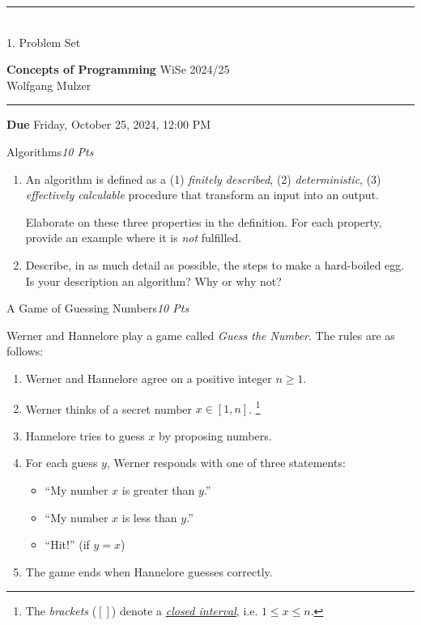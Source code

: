 \documentclass[a4paper,twoside,12pt]{article}
\newcommand{\ZETTELNUMMER}{1}
\newcommand{\ABGABEDATUM}{Friday, October 25, 2024, 12:00 PM}
\newcounter{AUFGNR}
\newcommand{\AUFGABE}[2]{\vspace{0.3cm}\item[Problem \arabic{AUFGNR}]\stepcounter{AUFGNR} #1\hfill\emph{#2}}
\begin{document}
\pagestyle{empty}
\hrule\medskip
\rule{0ex}{0ex}\\[-1ex]
\ZETTELNUMMER. Problem Set

\smallskip
\noindent
\large
\textbf{Concepts of Programming}\hfill 
WiSe 2024/25 \\[0.5ex]
\normalsize
Wolfgang Mulzer

\medskip\hrule

\smallskip
\noindent
\textbf{Due} \ABGABEDATUM

\vskip 0.5cm

\begin{description}

		\AUFGABE{Algorithms}{10 Pts}
\begin{enumerate}

\item An algorithm is defined as a (1) \emph{finitely described},
(2) \emph{deterministic}, (3) \emph{effectively calculable} procedure
that transform an input into an output.

Elaborate on these three properties in the definition.
For each property, provide an example
where it is \emph{not} fulfilled.

\item Describe, in as much detail as possible, the steps to
  make a hard-boiled egg. Is your description an algorithm?
Why or why not?
\end{enumerate} 



\AUFGABE{A Game of Guessing Numbers}{10 Pts}

Werner and Hannelore play a game called \emph{Guess the Number}.
The rules are as follows:
\begin{enumerate}
\item Werner and Hannelore agree on a positive integer $n \geq 1$.
\item Werner thinks of a secret number $x\in \left[1,n\right]$. \footnote{The \emph{brackets} ($\left[ \right]$) denote a \href{https://en.wikipedia.org/wiki/Interval_(mathematics)}{\emph{closed interval}}, i.e. $1\leq x \leq n$.} 
\item Hannelore tries to guess $x$ by proposing numbers.
\item For each guess $y$, Werner responds with one of three statements:
  \begin {itemize}
  \item ``My number $x$ is greater than $y$.''
  \item ``My number $x$ is less than $y$.''
  \item ``Hit!'' (if $y=x$)
  \end {itemize}
\item The game ends when Hannelore guesses correctly.
\end{enumerate}


\end{description}
\end{document}
